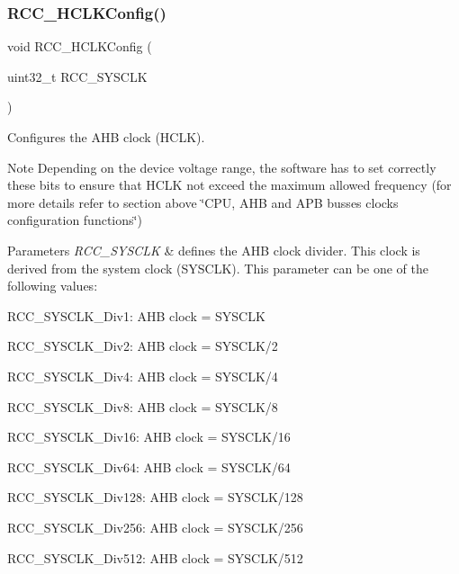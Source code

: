 \subsubsection{\texorpdfstring{R\+C\+C\+\_\+\+H\+C\+L\+K\+Config()}{RCC\_HCLKConfig()}}
{\footnotesize\ttfamily void R\+C\+C\+\_\+\+H\+C\+L\+K\+Config (\begin{DoxyParamCaption}\item[{uint32\+\_\+t}]{R\+C\+C\+\_\+\+S\+Y\+S\+C\+LK }\end{DoxyParamCaption})}



Configures the A\+HB clock (H\+C\+LK). 

\begin{DoxyNote}{Note}
Depending on the device voltage range, the software has to set correctly these bits to ensure that H\+C\+LK not exceed the maximum allowed frequency (for more details refer to section above \char`\"{}\+C\+P\+U, A\+H\+B and A\+P\+B busses clocks configuration functions\char`\"{}) 
\end{DoxyNote}

\begin{DoxyParams}{Parameters}
{\em R\+C\+C\+\_\+\+S\+Y\+S\+C\+LK} & defines the A\+HB clock divider. This clock is derived from the system clock (S\+Y\+S\+C\+LK). This parameter can be one of the following values\+: \begin{DoxyItemize}
\item R\+C\+C\+\_\+\+S\+Y\+S\+C\+L\+K\+\_\+\+Div1\+: A\+HB clock = S\+Y\+S\+C\+LK \item R\+C\+C\+\_\+\+S\+Y\+S\+C\+L\+K\+\_\+\+Div2\+: A\+HB clock = S\+Y\+S\+C\+L\+K/2 \item R\+C\+C\+\_\+\+S\+Y\+S\+C\+L\+K\+\_\+\+Div4\+: A\+HB clock = S\+Y\+S\+C\+L\+K/4 \item R\+C\+C\+\_\+\+S\+Y\+S\+C\+L\+K\+\_\+\+Div8\+: A\+HB clock = S\+Y\+S\+C\+L\+K/8 \item R\+C\+C\+\_\+\+S\+Y\+S\+C\+L\+K\+\_\+\+Div16\+: A\+HB clock = S\+Y\+S\+C\+L\+K/16 \item R\+C\+C\+\_\+\+S\+Y\+S\+C\+L\+K\+\_\+\+Div64\+: A\+HB clock = S\+Y\+S\+C\+L\+K/64 \item R\+C\+C\+\_\+\+S\+Y\+S\+C\+L\+K\+\_\+\+Div128\+: A\+HB clock = S\+Y\+S\+C\+L\+K/128 \item R\+C\+C\+\_\+\+S\+Y\+S\+C\+L\+K\+\_\+\+Div256\+: A\+HB clock = S\+Y\+S\+C\+L\+K/256 \item R\+C\+C\+\_\+\+S\+Y\+S\+C\+L\+K\+\_\+\+Div512\+: A\+HB clock = S\+Y\+S\+C\+L\+K/512 \end{DoxyItemize}
\\
\hline
\end{DoxyParams}

